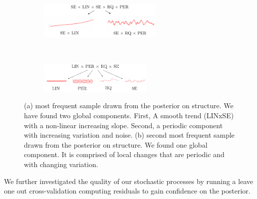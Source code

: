\begin{figure}
        \centering
        \begin{subfigure}[b]{\textwidth} \centering
                \includegraphics[width=0.65\textwidth]{figs/airline_struct_1.pdf}\caption{}
        \end{subfigure}\\
        
        \vspace*{0.75cm}
	\begin{subfigure}[b]{\textwidth} \centering
                \includegraphics[width=0.6\textwidth]{figs/airline_struct_2.pdf}\caption{}
        \end{subfigure}%
        \caption{(a) most frequent sample drawn from the posterior on structure. We have found two global components. First, A smooth trend (LINxSE) with a non-linear increasing slope. Second, a periodic component with increasing variation and noise. (b) second most frequent sample drawn from the posterior on structure. We found one global component. It is comprised of local changes that are periodic and with changing variation.}\label{fig:posterior_twosamples}
\end{figure}
We further investigated the quality of our stochastic processes by running a leave one out cross-validation computing residuals to gain confidence on the posterior.

